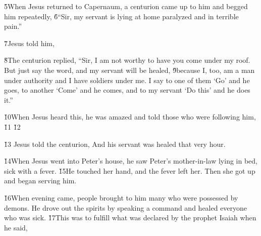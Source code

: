 \v{5}When Jesus returned to Capernaum, a centurion came up to him and begged him repeatedly, \v{6}``Sir, my servant is lying at home paralyzed and in terrible pain.''

\v{7}Jesus told him, 

\v{8}The centurion replied, ``Sir, I am not worthy to have you come under my roof. But just say the word, and my servant will be healed, \v{9}because I, too, am a man under authority and I have soldiers under me. I say to one of them `Go' and he goes, to another `Come' and he comes, and to my servant `Do this' and he does it.''

\v{10}When Jesus heard this, he was amazed and told those who were following him,  \v{11} \v{12}

\v{13} Jesus told the centurion,  And his servant was healed that very hour.

\v{14}When Jesus went into Peter's house, he saw Peter's mother-in-law lying in bed, sick with a fever. \v{15}He touched her hand, and the fever left her. Then she got up and began serving him.

\v{16}When evening came, people brought to him many who were possessed by demons. He drove out the spirits by speaking a command and healed everyone who was sick. \v{17}This was to fulfill what was declared by the prophet Isaiah when he said,

